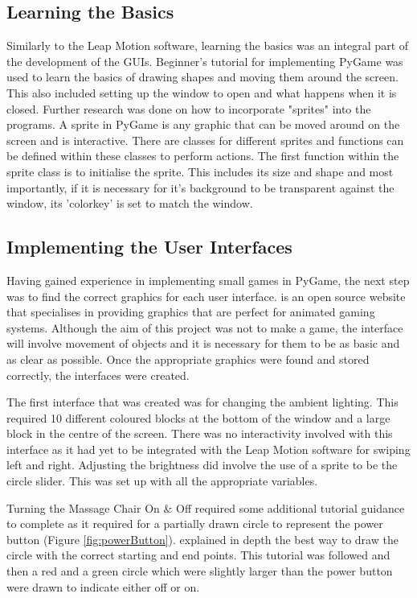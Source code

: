 \documentclass{l4proj}
\begin{document}
\subsection{Learning the Basics}
Similarly to the Leap Motion software, learning the basics was an integral part of the development of the GUIs. \cite{Nerd_Paradise} Beginner's tutorial for implementing PyGame was used to learn the basics of drawing shapes and moving them around the screen. This also included setting up the window to open and what happens when it is closed.
Further research was done on how to incorporate "sprites" into the programs. A sprite in PyGame is any graphic that can be moved around on the screen and is interactive. There are classes for different sprites and functions can be defined within these classes to perform actions. The first function within the sprite class is to initialise the sprite. This includes its size and shape and most importantly, if it is necessary for it's background to be transparent against the window, its 'colorkey' is set to match the window.

\subsection{Implementing the User Interfaces}
Having gained experience in implementing small games in PyGame, the next step was to find the correct graphics for each user interface. \cite{OpenGameArt.org} is an open source website that specialises in providing graphics that are perfect for animated gaming systems. Although the aim of this project was not to make a game, the interface will involve movement of objects and it is necessary for them to be as basic and as clear as possible. Once the appropriate graphics were found and stored correctly, the interfaces were created. 

The first interface that was created was for changing the ambient lighting. This required 10 different coloured blocks at the bottom of the window and a large block in the centre of the screen. There was no interactivity involved with this interface as it had yet to be integrated with the Leap Motion software for swiping left and right. Adjusting the brightness did involve the use of a sprite to be the circle slider. This was set up with all the appropriate variables.

Turning the Massage Chair On \& Off required some additional tutorial guidance to complete as it required for a partially drawn circle to represent the power button (Figure \ref{fig:powerButton}). \cite{Conrad} explained in depth the best way to draw the circle with the correct starting and end points. This tutorial was followed and then a red and a green circle which were slightly larger than the power button were drawn to indicate either off or on. 
\end{document}
